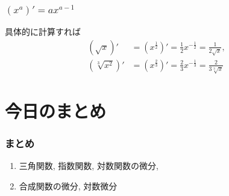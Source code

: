 

\begin{frame}
\frametitle{$(x^a)'=ax^{a-1}$}


具体的に計算すれば
\begin{align*}
(\sqrt{x})' &= (x^{\frac{1}{2}})'=\frac{1}{2}x^{-\frac{1}{2}}= \frac{1}{2 \sqrt{x}}, \\
(\sqrt[3]{x^2})' &= (x^{\frac{2}{3}})'=\frac{2}{3}x^{-\frac{1}{3}}= \frac{2}{3 \sqrt[3]{x}}
\end{align*}


\end{frame}







\section{今日のまとめ}
\begin{frame}
\frametitle{まとめ}   


\begin{enumerate}
\item 三角関数, 指数関数, 対数関数の微分,
\item 合成関数の微分, 対数微分
\end{enumerate} 


\end{frame}
